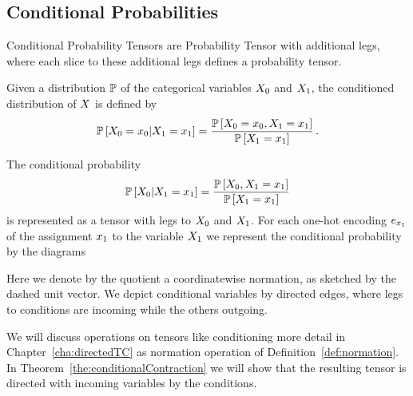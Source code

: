 


\subsection{Conditional Probabilities}

Conditional Probability Tensors are Probability Tensor with additional legs, where each slice to these additional legs defines a probability tensor.

\begin{definition}\label{def:conditionalProbability}
	Given a distribution $\mathbb{P}$ of the categorical variables $X_{0}$ and $X_{1}$, the conditioned distribution of $X$ is defined by
		\[ \mathbb{P}\left[X_{0}=x_{0}|X_{1}=x_{1}\right]  
		= \frac{\mathbb{P}\left[X_{0} = x_{0},X_{1}=x_{1}\right]}{\mathbb{P}\left[X_{1}=x_{1}\right]} \, . \]
\end{definition}


The conditional probability
	\[ \mathbb{P}\left[X_{0}|X_{1}=x_{1}\right]  
	= \frac{\mathbb{P}\left[X_{0},X_{1}=x_{1}\right]}{\mathbb{P}\left[X_{1}=x_{1}\right]} \]
is represented as a tensor with legs to $X_{0}$ and $X_{1}$.
For each one-hot encoding $e_{x_{1}}$ of the assignment $x_{1}$ to the variable $X_{1}$ we represent the conditional probability by the diagrams
\begin{center}
	
\end{center}



Here we denote by the quotient a coordinatewise normation, as sketched by the dashed unit vector. %
We depict conditional variables by directed edges, where legs to conditions are incoming while the others outgoing.

We will discuss operations on tensors like conditioning more detail in Chapter~\ref{cha:directedTC} as normation operation of Definition~\ref{def:normation}.
In Theorem~\ref{the:conditionalContraction} we will show that the resulting tensor is directed with incoming variables by the conditions.

